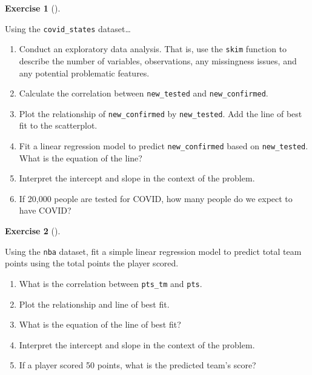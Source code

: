 \documentclass[
  letterpaper,
  DIV=11,
  numbers=noendperiod]{scrreprt}
\providecommand{\tightlist}{%
  \setlength{\itemsep}{0pt}\setlength{\parskip}{0pt}}\usepackage{longtable,booktabs,array}
\theoremstyle{definition}
\newtheorem{exercise}{Exercise}[chapter]
\theoremstyle{remark}
\begin{document}
\begin{exercise}[]\protect\hypertarget{exr-ch05-app1}{}\label{exr-ch05-app1}

Using the \texttt{covid\_states} dataset\ldots{}

\begin{enumerate}
\def\labelenumi{\alph{enumi})}
\tightlist
\item
  Conduct an exploratory data analysis. That is, use the \texttt{skim}
  function to describe the number of variables, observations, any
  missingness issues, and any potential problematic features.
\item
  Calculate the correlation between \texttt{new\_tested} and
  \texttt{new\_confirmed}.
\item
  Plot the relationship of \texttt{new\_confirmed} by
  \texttt{new\_tested}. Add the line of best fit to the scatterplot.
\item
  Fit a linear regression model to predict \texttt{new\_confirmed} based
  on \texttt{new\_tested}. What is the equation of the line?
\item
  Interpret the intercept and slope in the context of the problem.
\item
  If 20,000 people are tested for COVID, how many people do we expect to
  have COVID?
\end{enumerate}

\end{exercise}

\begin{exercise}[]\protect\hypertarget{exr-ch05-app2}{}\label{exr-ch05-app2}

Using the \texttt{nba} dataset, fit a simple linear regression model to
predict total team points using the total points the player scored.

\begin{enumerate}
\def\labelenumi{\alph{enumi})}
\tightlist
\item
  What is the correlation between \texttt{pts\_tm} and \texttt{pts}.
\item
  Plot the relationship and line of best fit.
\item
  What is the equation of the line of best fit?
\item
  Interpret the intercept and slope in the context of the problem.
\item
  If a player scored 50 points, what is the predicted team's score?
\end{enumerate}

\end{exercise}
\end{document}
